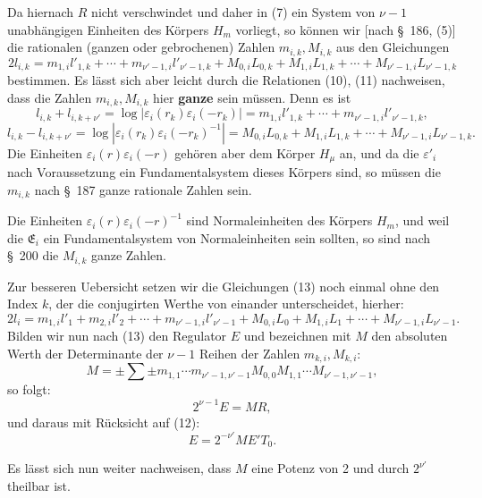 \documentclass[11pt]{article}
\begin{document}
Da hiernach $R$ nicht verschwindet und daher in (7) ein System von $\nu-1$ unabhängigen Einheiten des Körpers $H_m$ vorliegt, so können wir [nach \S~186, (5)] die rationalen (ganzen oder gebrochenen) Zahlen $m_{i,k},M_{i,k}$ aus den Gleichungen
\begin{equation}
2l_{i,k}=m_{1,i}l'_{1,k}+\cdots+m_{\nu'-1,i}l'_{\nu'-1,k}
+M_{0,i}L_{0,k}+M_{1,i}L_{1,k}+\cdots+M_{\nu'-1,i}L_{\nu'-1,k}
\tag{13}
\end{equation}
bestimmen. Es lässt sich aber leicht durch die Relationen (10), (11) nachweisen, dass die Zahlen $m_{i,k},M_{i,k}$ hier \textbf{ganze} sein müssen. Denn es ist
\[
l_{i,k}+l_{i,k+\nu'}=\log|\varepsilon_i(r_k)\varepsilon_i(-r_k)|
=m_{1,i}l'_{1,k}+\cdots+m_{\nu'-1,i}l'_{\nu'-1,k},
\]
\[
l_{i,k}-l_{i,k+\nu'}=\log|\varepsilon_i(r_k)\varepsilon_i(-r_k)^{-1}|
=M_{0,i}L_{0,k}+M_{1,i}L_{1,k}+\cdots+M_{\nu'-1,i}L_{\nu'-1,k}.
\]
Die Einheiten $\varepsilon_i(r)\varepsilon_i(-r)$ gehören aber dem Körper $H_\mu$ an, und da die $\varepsilon'_i$ nach Voraussetzung ein Fundamentalsystem dieses Körpers sind, so müssen die $m_{i,k}$ nach \S~187 ganze rationale Zahlen sein.

Die Einheiten $\varepsilon_i(r)\varepsilon_i(-r)^{-1}$ sind Normaleinheiten des Körpers $H_m$, und weil die $\mathfrak E_i$ ein Fundamentalsystem von Normaleinheiten sein sollten, so sind nach \S~200 die $M_{i,k}$ ganze Zahlen.

Zur besseren Uebersicht setzen wir die Gleichungen (13) noch einmal ohne den Index $k$, der die conjugirten Werthe von einander unterscheidet, hierher:
\begin{equation}
2l_i=m_{1,i}l'_1+m_{2,i}l'_2+\cdots+m_{\nu'-1,i}l'_{\nu'-1}
+M_{0,i}L_0+M_{1,i}L_1+\cdots+M_{\nu'-1,i}L_{\nu'-1}.
\tag{14}
\end{equation}
Bilden wir nun nach (13) den Regulator $E$ und bezeichnen mit $M$ den absoluten Werth der Determinante der $\nu-1$ Reihen der Zahlen $m_{k,i},M_{k,i}$:
\[
M=\pm\sum\pm m_{1,1}\cdots m_{\nu'-1,\nu'-1}M_{0,0}M_{1,1}\cdots M_{\nu'-1,\nu'-1},
\]
so folgt:
\begin{equation}
2^{\nu-1}E=MR,
\tag{15}
\end{equation}
und daraus mit Rücksicht auf (12):
\begin{equation}
E=2^{-\nu'}ME'T_0.
\tag{16}
\end{equation}

Es lässt sich nun weiter nachweisen, dass $M$ eine Potenz von 2 und durch $2^{\nu'}$ theilbar ist.
\end{document}
